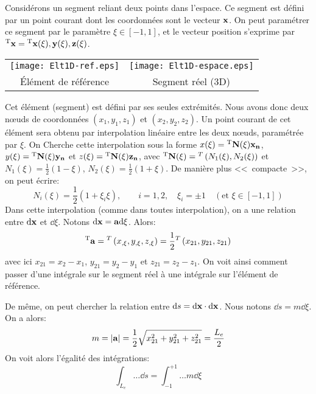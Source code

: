 Considérons un segment reliant deux points dans l'espace.
Ce segment est défini par un point courant dont les coordonnées sont le vecteur $\mathbf{x}$.
On peut paramétrer ce segment par le paramètre $\xi \in [-1,1]$, et le vecteur
position s'exprime par ${}^\mathrm{T}\mathbf{x}={}^\mathrm{T}\mathbf{x(\xi), y(\xi), z(\xi)}$.
\begin{table}[ht]\centering\small
\begin{tabular}{cc}
\texttt{[image: Elt1D-ref.eps]} &
\texttt{[image: Elt1D-espace.eps]} \\
Élément de référence & Segment réel (3D)
\end{tabular}
\end{table}
\medskip
Cet élément (segment) est défini par ses seules extrémités. Nous avons donc deux
nœuds de coordonnées $(x_1, y_1, z_1)$ et $(x_2, y_2, z_2)$.
Un point courant de cet élément sera obtenu par interpolation linéaire entre les deux nœuds,
paramétrée par $\xi$. On Cherche cette interpolation sous la forme $x(\xi)={}^\mathrm{T}\mathbf{N(\xi)}\mathbf{x_n}$, $y(\xi)={}^\mathrm{T}\mathbf{N(\xi)}\mathbf{y_n}$ et $z(\xi)={}^\mathrm{T}\mathbf{N(\xi)}\mathbf{z_n}$, avec
${}^\mathrm{T}\mathbf{N(\xi)}={}^T\left( N_1(\xi), N_2(\xi)\right)$ et $N_1(\xi)=\frac12 (1-\xi)$, $N_2(\xi)=\frac12(1+\xi)$.
De manière plus <<~compacte~>>, on peut écrire:
\begin{equation} N_i(\xi)=\frac12(1+\xi_i\xi), \qquad i=1,2, \quad \xi_i=\pm1 \quad (\text{et } \xi\in[-1,1]) \end{equation}
\medskip
Dans cette interpolation (comme dans toutes interpolation), on a une relation entre $\text{d}\mathbf{x}$ et
$ \dd \xi$. Notons $\text{d}\mathbf{x} = \mathbf{a}  \text{d} \xi$. Alors:
\begin{equation} {}^\mathrm{T}\mathbf{a} = {}^T\left( x_{,\xi}, y_{,\xi}, z_{,\xi}\right) = \frac12 {}^T\left( x_{21}, y_{21}, z_{21}\right)\end{equation}
avec ici $x_{21}=x_2-x_1$, $y_{21}=y_2-y_1$ et $z_{21}=z_2-z_1$.
On voit ainsi comment passer d'une intégrale sur le segment réel à une intégrale
sur l'élément de référence.

\medskip
De même, on peut chercher la relation entre $\text{d} s=\text{d}\mathbf{x}\cdot\text{d}\mathbf{x}$. Nous notons
$\dd s=m  \dd \xi$. On a alors: 
\begin{equation}m=|\mathbf{a}| = \frac12 \sqrt{x_{21}^2+y_{21}^2+z_{21}^2} = \frac{L_e}2 \end{equation}
On voit alors l'égalité des intégrations:
\begin{equation}\int_{L_e} \ldots \dd s = \int_{-1}^{+1}\ldots m \dd \xi\end{equation}

